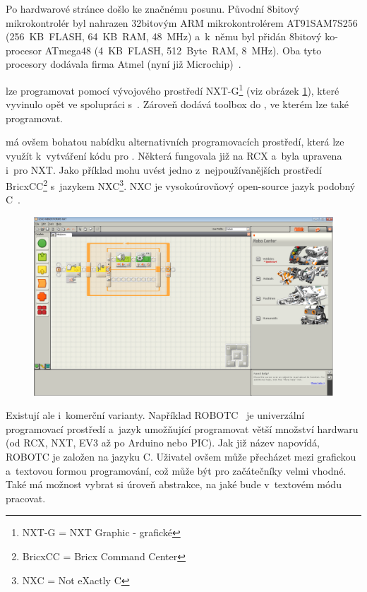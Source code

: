 Po hardwarové stránce došlo ke značnému posunu. Původní 8bitový mikrokontrolér byl nahrazen 32bitovým ARM mikrokontrolérem %
AT91SAM7S256 (256~KB~FLASH, 64~KB~RAM, 48~MHz) a~k~němu byl přidán 8bitový ko-procesor ATmega48 (4~KB~FLASH, 512~Byte~RAM, 8~MHz). 
Oba tyto procesory dodávala firma Atmel (nyní již Microchip)~\cite{legoMindstormsNXT_hardware}.


\brick{ }lze programovat pomocí vývojového prostředí NXT-G\footnote{NXT-G = NXT Graphic - grafické} (viz obrázek \ref{fig:lego-mindstorms-nxt-g}), které \lego{ }vyvinulo opět ve spolupráci s~\NI{~}\cite{legoMindstormsNXT_NXT-G}. 
Zároveň \NI{ }dodává toolbox do \labview{}, ve kterém lze \brick{ }také programovat. 

\legoNXT{ }má ovšem bohatou nabídku alternativních programovacích prostředí, která lze využít k~vytváření kódu pro \brick. 
Některá fungovala již na RCX a~byla upravena i~pro NXT. 
Jako příklad mohu uvést jedno z~nejpoužívanějších prostředí BricxCC\footnote{BricxCC = Bricx Command Center} s~jazykem NXC\footnote{NXC = Not eXactly C}. 
NXC je vysokoúrovňový open-source jazyk podobný C~\cite{legoWikipediaNXT_NXC}.

\begin{figure}[h]
	\centering
	\includegraphics[width=\textwidth]{images/lego-mindstorms-nxt-g.png}
	\caption[]{\protect\footnotemark}
	\label{fig:lego-mindstorms-nxt-g}
\end{figure}

Existují ale i~komerční varianty. 
Například ROBOTC~\cite{legoProgramingPlatform_ROBOTC} je univerzální programovací prostředí a~jazyk umožňující programovat větší množství hardwaru (od \legoM{ }RCX, NXT, EV3 až po Arduino nebo PIC). 
Jak již název napovídá, ROBOTC je založen na jazyku C.
Uživatel ovšem může přecházet mezi grafickou a~textovou formou programování, což může být pro začátečníky velmi vhodné.
Také má možnost vybrat si úroveň abstrakce, na jaké bude v~textovém módu pracovat.  

